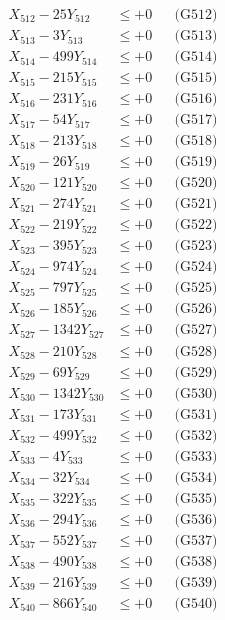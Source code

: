 \documentclass[a4paper,10pt]{article}
\begin{document}
{\begin{align}
X_{512} - 25Y_{512} &\leq +0 && \text{(G512)} \\
X_{513} - 3Y_{513} &\leq +0 && \text{(G513)} \\
X_{514} - 499Y_{514} &\leq +0 && \text{(G514)} \\
X_{515} - 215Y_{515} &\leq +0 && \text{(G515)} \\
X_{516} - 231Y_{516} &\leq +0 && \text{(G516)} \\
X_{517} - 54Y_{517} &\leq +0 && \text{(G517)} \\
X_{518} - 213Y_{518} &\leq +0 && \text{(G518)} \\
X_{519} - 26Y_{519} &\leq +0 && \text{(G519)} \\
X_{520} - 121Y_{520} &\leq +0 && \text{(G520)} \\
\allowbreak
X_{521} - 274Y_{521} &\leq +0 && \text{(G521)} \\
X_{522} - 219Y_{522} &\leq +0 && \text{(G522)} \\
X_{523} - 395Y_{523} &\leq +0 && \text{(G523)} \\
X_{524} - 974Y_{524} &\leq +0 && \text{(G524)} \\
X_{525} - 797Y_{525} &\leq +0 && \text{(G525)} \\
X_{526} - 185Y_{526} &\leq +0 && \text{(G526)} \\
X_{527} - 1342Y_{527} &\leq +0 && \text{(G527)} \\
X_{528} - 210Y_{528} &\leq +0 && \text{(G528)} \\
X_{529} - 69Y_{529} &\leq +0 && \text{(G529)} \\
X_{530} - 1342Y_{530} &\leq +0 && \text{(G530)} \\
\allowbreak
X_{531} - 173Y_{531} &\leq +0 && \text{(G531)} \\
X_{532} - 499Y_{532} &\leq +0 && \text{(G532)} \\
X_{533} - 4Y_{533} &\leq +0 && \text{(G533)} \\
X_{534} - 32Y_{534} &\leq +0 && \text{(G534)} \\
X_{535} - 322Y_{535} &\leq +0 && \text{(G535)} \\
X_{536} - 294Y_{536} &\leq +0 && \text{(G536)} \\
X_{537} - 552Y_{537} &\leq +0 && \text{(G537)} \\
X_{538} - 490Y_{538} &\leq +0 && \text{(G538)} \\
X_{539} - 216Y_{539} &\leq +0 && \text{(G539)} \\
X_{540} - 866Y_{540} &\leq +0 && \text{(G540)} \\

\end{align}}
\end{document}
